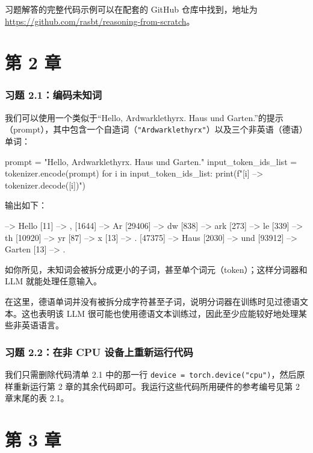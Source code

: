 习题解答的完整代码示例可以在配套的 GitHub 仓库中找到，地址为 \href{https://github.com/rasbt/reasoning-from-scratch}{https://github.com/rasbt/reasoning-from-scratch}。

\section{第 2 章}

\subsubsection*{习题 2.1：编码未知词}

我们可以使用一个类似于“Hello, Ardwarklethyrx. Haus und Garten.”的提示（prompt），其中包含一个自造词（\texttt{"}\texttt{Ardwarklethyrx}\texttt{"}）以及三个非英语（德语）单词：

\begin{codebox}
prompt = "Hello, Ardwarklethyrx. Haus und Garten."
input_token_ids_list = tokenizer.encode(prompt)
for i in input_token_ids_list:
    print(f"{[i]} --> {tokenizer.decode([i])}")
\end{codebox}

输出如下：

\begin{codebox}
[9707] --> Hello
[11] --> ,
[1644] -->  Ar
[29406] --> dw
[838] --> ark
[273] --> le
[339] --> th
[10920] --> yr
[87] --> x
[13] --> .
[47375] -->  Haus
[2030] -->  und
[93912] -->  Garten
[13] --> .
\end{codebox}

如你所见，未知词会被拆分成更小的子词，甚至单个词元（token）；这样分词器和 LLM 就能处理任意输入。

在这里，德语单词并没有被拆分成字符甚至子词，说明分词器在训练时见过德语文本。这也表明该 LLM 很可能也使用德语文本训练过，因此至少应能较好地处理某些非英语语言。

\subsubsection*{习题 2.2：在非 CPU 设备上重新运行代码}

我们只需删除代码清单 2.1 中的那一行 \texttt{device = torch.device(}\texttt{"}\texttt{cpu}\texttt{"}\texttt{)}，然后原样重新运行第 2 章的其余代码即可。我运行这些代码所用硬件的参考编号见第 2 章末尾的表 2.1。

\section{第 3 章}

